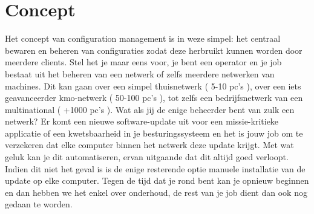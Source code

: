 \section{Concept}
Het concept van configuration management is in weze simpel: het centraal bewaren en beheren van configuraties zodat deze herbruikt kunnen worden door meerdere clients. Stel het je maar eens voor, je bent een operator en je job bestaat uit het beheren van een netwerk of zelfs meerdere netwerken van machines. Dit kan gaan over een simpel thuisnetwerk ( 5-10 pc's ), over een iets geavanceerder kmo-netwerk ( 50-100 pc's ), tot zelfs een bedrijfsnetwerk van een multinational ( +1000 pc's ). Wat als jij de enige beheerder bent van zulk een netwerk? Er komt een nieuwe software-update uit voor een missie-kritieke applicatie of een kwetsbaarheid in je besturingssysteem en het is jouw job om te verzekeren dat elke computer binnen het netwerk deze update krijgt. Met wat geluk kan je dit automatiseren, ervan uitgaande dat dit altijd goed verloopt. Indien dit niet het geval is is de enige resterende optie manuele installatie van de update op elke computer. Tegen de tijd dat je rond bent kan je opnieuw beginnen en dan hebben we het enkel over onderhoud, de rest van je job dient dan ook nog gedaan te worden.\\\\
